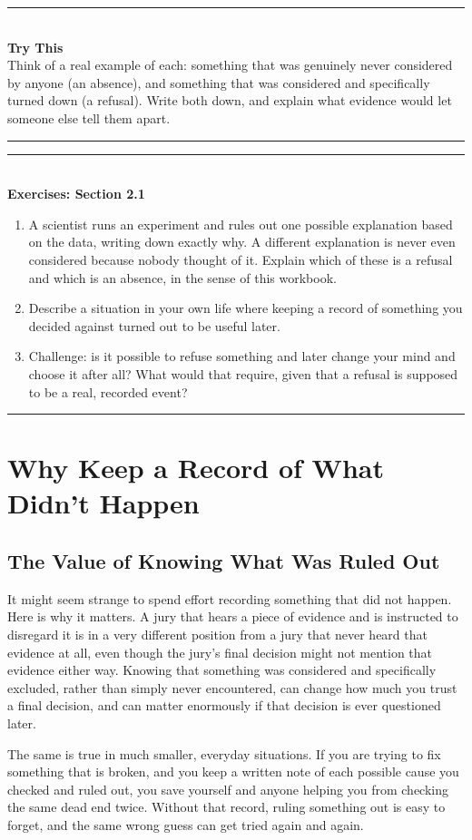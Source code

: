 \documentclass[11pt]{book}
\newenvironment{exercisebox}[1]{%
\vspace{0.8em}\noindent\rule{\linewidth}{0.6pt}\\[0.2em]\textbf{Exercises: #1}\\[0.3em]%
\begin{enumerate}[label=\arabic*., itemsep=0.4em]}%
{\end{enumerate}\noindent\rule{\linewidth}{0.6pt}\vspace{0.6em}}
\newenvironment{trythis}{%
\vspace{0.6em}\noindent\rule{\linewidth}{0.6pt}\\[0.2em]\textbf{Try This}\\[0.3em]}%
{\\[0.2em]\noindent\rule{\linewidth}{0.6pt}\vspace{0.6em}}
\begin{document}
\begin{trythis}
Think of a real example of each: something that was genuinely never considered by anyone (an absence), and something that was considered and specifically turned down (a refusal). Write both down, and explain what evidence would let someone else tell them apart.
\end{trythis}

\begin{exercisebox}{Section 2.1}
\item A scientist runs an experiment and rules out one possible explanation based on the data, writing down exactly why. A different explanation is never even considered because nobody thought of it. Explain which of these is a refusal and which is an absence, in the sense of this workbook.
\item Describe a situation in your own life where keeping a record of something you decided against turned out to be useful later.
\item Challenge: is it possible to refuse something and later change your mind and choose it after all? What would that require, given that a refusal is supposed to be a real, recorded event?
\end{exercisebox}

\chapter{Why Keep a Record of What Didn't Happen}

\section{The Value of Knowing What Was Ruled Out}

It might seem strange to spend effort recording something that did not happen. Here is why it matters. A jury that hears a piece of evidence and is instructed to disregard it is in a very different position from a jury that never heard that evidence at all, even though the jury's final decision might not mention that evidence either way. Knowing that something was considered and specifically excluded, rather than simply never encountered, can change how much you trust a final decision, and can matter enormously if that decision is ever questioned later.

The same is true in much smaller, everyday situations. If you are trying to fix something that is broken, and you keep a written note of each possible cause you checked and ruled out, you save yourself and anyone helping you from checking the same dead end twice. Without that record, ruling something out is easy to forget, and the same wrong guess can get tried again and again.
\end{document}
